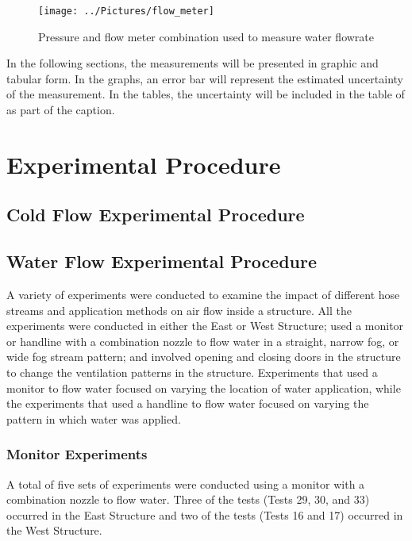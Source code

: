 \documentclass[12pt,oneside]{book}
\begin{document}
\begin{figure}[!ht]
\texttt{[image: ../Pictures/flow\_meter]}
\caption[Picture of Flowrate Meter]{Pressure and flow meter combination used to measure water flowrate}
\label{fig:flow_meter}
\end{figure}
\FloatBarrier

In the following sections, the measurements will be presented in graphic and tabular form. In the graphs, an error bar will represent the estimated uncertainty of the measurement. In the tables, the uncertainty will be included in the table of as part of the caption.

\section{Experimental Procedure}
\label{sec:Experimental_Procedure}

\subsection{Cold Flow Experimental Procedure}
\label{sec:Cold_Flow_Procedure}

\subsection{Water Flow Experimental Procedure}
\label{sec:Water_Flow_Procedure}
A variety of experiments were conducted to examine the impact of different hose streams and application methods on air flow inside a structure. All the experiments were conducted in either the East or West Structure; used a monitor or handline with a combination nozzle to flow water in a straight, narrow fog, or wide fog stream pattern; and involved opening and closing doors in the structure to change the ventilation patterns in the structure. Experiments that used a monitor to flow water focused on varying the location of water application, while the experiments that used a handline to flow water focused on varying the pattern in which water was applied.

\subsubsection{Monitor Experiments}
\label{sec:Water_Flow_Monitor_Procedure}
A total of five sets of experiments were conducted using a monitor with a combination nozzle to flow water. Three of the tests (Tests 29, 30, and 33) occurred in the East Structure and two of the tests (Tests 16 and 17) occurred in the West Structure. 
\end{document}
